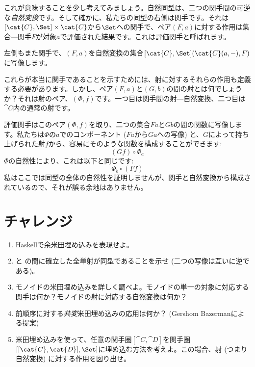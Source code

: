 これが意味することを少し考えてみましょう。自然同型は、二つの関手間の可逆な\emph{自然変換}です。そして確かに、私たちの同型の右側は関手です。それは$[\cat{C}, \Set] \times \cat{C}$から$\Set$への関手で、ペア$(F, a)$に対する作用は集合---関手$F$が対象$a$で評価された結果です。これは評価関手と呼ばれます。

左側もまた関手で、$(F, a)$を自然変換の集合$[\cat{C}, \Set](\cat{C}(a, -), F)$に写像します。

これらが本当に関手であることを示すためには、射に対するそれらの作用も定義する必要があります。しかし、ペア$(F, a)$と$(G, b)$の間の射とは何でしょうか？それは射のペア、$(\Phi, f)$です。一つ目は関手間の射---自然変換、二つ目は$\cat{C}$内の通常の射です。

評価関手はこのペア$(\Phi, f)$を取り、二つの集合$F a$と$G b$の間の関数に写像します。私たちは$\Phi$の$a$でのコンポーネント ($F a$から$G a$への写像) と、$G$によって持ち上げられた射$f$から、容易にそのような関数を構成することができます: 
\[(G f) \circ \Phi_a\]
$\Phi$の自然性により、これは以下と同じです: 
\[\Phi_b \circ (F f)\]
私はここでは同型の全体の自然性を証明しませんが、関手と自然変換から構成されているので、それが誤る余地はありません。

\section{チャレンジ}

\begin{enumerate}
  \tightlist
  \item
        Haskellで余米田埋め込みを表現せよ。
  \item
         と  の間に確立した全単射が同型であることを示せ (二つの写像は互いに逆である)。
  \item
        モノイドの米田埋め込みを詳しく調べよ。モノイドの単一の対象に対応する関手は何か？モノイドの射に対応する自然変換は何か？
  \item
        前順序に対する\emph{共変}米田埋め込みの応用は何か？ (Gershom Bazermanによる提案) 
  \item
        米田埋め込みを使って、任意の関手圏$[\cat{C}, \cat{D}]$を関手圏$[[\cat{C}, \cat{D}], \Set]$に埋め込む方法を考えよ。この場合、射 (つまり自然変換) に対する作用を図り出せ。
\end{enumerate}
